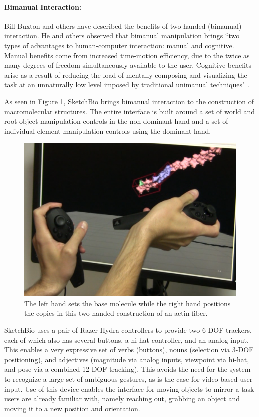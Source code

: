 \documentclass[twocolumn]{bmcart}%
\begin{document}
\paragraph*{Bimanual Interaction:}
Bill Buxton and others have described the benefits of two-handed (bimanual) interaction.
He and others observed that bimanual manipulation brings ``two types of advantages to human-computer interaction: manual and cognitive. Manual benefits come from increased time-motion efficiency, due to the twice as many degrees of freedom simultaneously available to the user.
Cognitive benefits arise as a result of reducing the load of mentally composing and visualizing the task at an unnaturally low level imposed by traditional unimanual techniques" \cite{Leganchuk1998manual}.

As seen in Figure \ref{fig:two_hands}, SketchBio brings bimanual interaction to the construction of macromolecular structures.
The entire interface is built around a set of world and root-object manipulation controls in the non-dominant hand and a set of individual-element manipulation controls using the dominant hand.

\begin{figure}[ht]
\centering
\includegraphics[width=0.9\columnwidth]{two_hands.png}
\caption{The left hand sets the base molecule while the right hand positions the copies in this two-handed construction of an actin fiber.}
\label{fig:two_hands}
\end{figure}

SketchBio uses a pair of Razer Hydra controllers to provide two 6-DOF trackers, each of which also has several buttons, a hi-hat controller, and an analog input.
This enables a very expressive set of verbs (buttons), nouns (selection via 3-DOF positioning), and adjectives (magnitude via analog inputs, viewpoint via hi-hat, and pose via a combined 12-DOF tracking).
This avoids the need for the system to recognize a large set of ambiguous gestures, as is the case for video-based user input.
Use of this device enables the interface for moving objects to mirror a task users are already familiar with, namely reaching out, grabbing an object and moving it to a new position and orientation.
\end{document}
